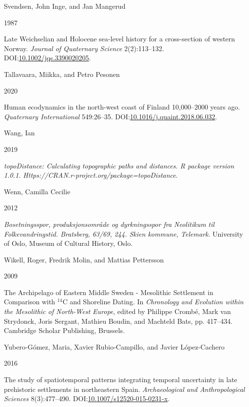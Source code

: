 \documentclass[
]{article}
\newlength{\cslhangindent}
\newlength{\csllabelwidth}
\newlength{\cslentryspacingunit} %
\newenvironment{CSLReferences}[2] %
 {%
  \setlength{\parindent}{0pt}
  \ifodd #1
  \let\oldpar\par
  \def\par{\hangindent=\cslhangindent\oldpar}
  \fi
  \setlength{\parskip}{#2\cslentryspacingunit}
 }%
 {}
\newcommand{\CSLBlock}[1]{#1\hfill\break}
\newcommand{\CSLLeftMargin}[1]{\parbox[t]{\csllabelwidth}{#1}}
\newcommand{\CSLRightInline}[1]{\parbox[t]{\linewidth - \csllabelwidth}{#1}\break}
\begin{document}
\begin{CSLReferences}{0}{0}
\leavevmode{}%
\CSLBlock{Svendsen, John Inge, and Jan Mangerud}
\CSLLeftMargin{ 1987}
\CSLRightInline{Late Weichselian and Holocene sea-level history for a cross-section of western Norway. \emph{Journal of Quaternary Science} 2(2):113--132. DOI:\href{https://doi.org/10.1002/jqs.3390020205}{10.1002/jqs.3390020205}.}

\leavevmode{}%
\CSLBlock{Tallavaara, Miikka, and Petro Pesonen}
\CSLLeftMargin{ 2020}
\CSLRightInline{Human ecodynamics in the north-west coast of Finland 10,000--2000 years ago. \emph{Quaternary International} 549:26--35. DOI:\href{https://doi.org/10.1016/j.quaint.2018.06.032}{10.1016/j.quaint.2018.06.032}.}

\leavevmode{}%
\CSLBlock{Wang, Ian}
\CSLLeftMargin{ 2019}
\CSLRightInline{\emph{topoDistance: Calculating topographic paths and distances. R package version 1.0.1. Https://CRAN.r-project.org/package=topoDistance}.}

\leavevmode{}%
\CSLBlock{Wenn, Camilla Cecilie}
\CSLLeftMargin{ 2012}
\CSLRightInline{\emph{{Bosetningsspor, produksjonsområde og dyrkningsspor fra Neolitikum til Folkevandringstid. Bratsberg, 63/69, 244. Skien kommune, Telemark}}. University of Oslo, Museum of Cultural History, Oslo.}

\leavevmode{}%
\CSLBlock{Wikell, Roger, Fredrik Molin, and Mattias Pettersson}
\CSLLeftMargin{ 2009}
\CSLRightInline{{The Archipelago of Eastern Middle Sweden - Mesolithic Settlement in Comparison with \(^{14}\)C and Shoreline Dating}. In \emph{{Chronology and Evolution within the Mesolithic of North-West Europe}}, edited by Philippe Crombé, Mark van Strydonck, Joris Sergant, Mathieu Boudin, and Machteld Bats, pp. 417--434. Cambridge Scholar Publishing, Brussels.}

\leavevmode{}%
\CSLBlock{Yubero-Gómez, Maria, Xavier Rubio-Campillo, and Javier López-Cachero}
\CSLLeftMargin{ 2016}
\CSLRightInline{{The study of spatiotemporal patterns integrating temporal uncertainty in late prehistoric settlements in northeastern Spain}. \emph{Archaeological and Anthropological Sciences} 8(3):477--490. DOI:\href{https://doi.org/10.1007/s12520-015-0231-x}{10.1007/s12520-015-0231-x}.}

\end{CSLReferences}
\end{document}
